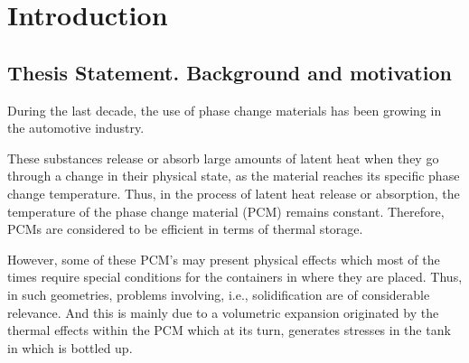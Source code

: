 
\chapter{Introduction} %

\label{Chapter1} %


\newcommand{\keyword}[1]{\textbf{#1}}
\newcommand{\tabhead}[1]{\textbf{#1}}
\newcommand{\code}[1]{\texttt{#1}}
\newcommand{\file}[1]{\texttt{\bfseries#1}}
\newcommand{\option}[1]{\texttt{\itshape#1}}
\setcounter{secnumdepth}{4}

\section{Thesis Statement. Background and motivation}

\setlength{\parindent}{0.5cm} During the last decade, the use of phase change materials has been growing in the automotive industry. 

\noindent These substances release or absorb large amounts of latent heat when they go through a change in their physical state, as the material reaches its specific phase change temperature. Thus, in the process of latent heat release or absorption, the temperature of the phase change material (PCM) remains constant. Therefore, PCMs are considered to be efficient in terms of thermal storage. 

\noindent However, some of these PCM's may present physical effects which most of the times require special conditions for the containers in where they are placed. Thus, in such geometries, problems involving, i.e., solidification are of considerable relevance. And this is mainly due to a volumetric expansion originated by the thermal effects within the PCM which at its turn, generates stresses in the tank in which is bottled up.

